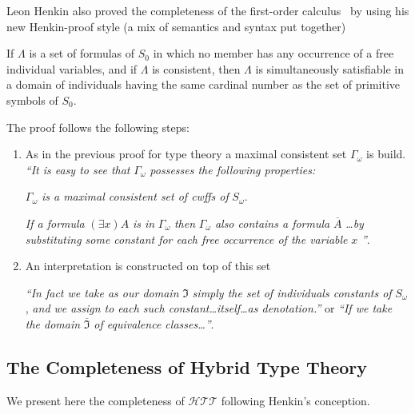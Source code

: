 Leon Henkin also proved the completeness of the first-order 
calculus~\cite{Henkin1949} by using his new Henkin-proof style (a mix of semantics and
syntax put together)

\begin{theorem}
If $\Lambda$  is a set of formulas of 
$S_{0}$  in which no member has any occurrence of a free individual
variables, and if  $\Lambda$  is consistent, then  $\Lambda$
 is simultaneously satisfiable in a domain of individuals having
the same cardinal number as the set of primitive symbols of $S_{0}$.
\end{theorem}

The proof follows the following steps:

\begin{enumerate}
\item As in the previous proof for type theory a maximal consistent set
$\Gamma_{\omega}$ is build. \emph{``It is easy to see that} 
$\Gamma_{\omega}$ \emph{possesses the following properties:}

$\Gamma_{\omega}$ \emph{is a maximal consistent set of cwffs of}
$S_{\omega}$.

\emph{If a formula} $(\exists x)A$ \emph{is in} $\Gamma_{\omega}$
\emph{then} $\Gamma_{\omega}$ \emph{also contains a formula}
$\overline{A}$ \emph{\ldots by substituting some constant for each free
occurrence of the variable} $x$ \emph{''}.

\item An interpretation is constructed on top of this set

\emph{``In fact we take as our domain} $\Im$ \emph{simply the set of
individuals constants of} $S_{\omega}$, \emph{and we assign to each such
constant\ldots itself\ldots as denotation.''} or \emph{``If we take the
domain} $\overline{\Im }$ \emph{of equivalence classes\ldots ''}.
\end{enumerate}

\subsection{The Completeness of Hybrid Type Theory}

We present here the completeness of $\mathcal{HTT}$ following Henkin's
conception.

